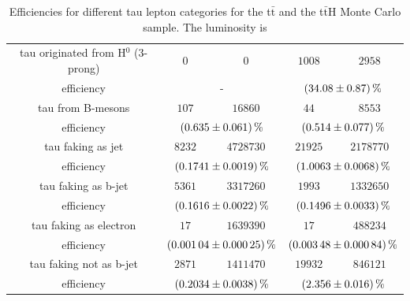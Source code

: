 \begin{table}
\begin{tabular*}{\linewidth}{@{\extracolsep{\fill}}ccccc}
		\\
		\hline
                tau originated from H$^0$ (3-prong)& $0$        & $0$         & $1008$          & $2958$
		\\
		efficiency                  & \multicolumn{2}{c}{-}   & \multicolumn{2}{c}{$\SI{34.08\pm 0.87}{\percent}$}
		\\
		\hline
		tau from B-mesons           & $107$            & $16860$      & $44$            & $8553$ 
		\\
		efficiency                  & \multicolumn{2}{c}{$\SI{0.635\pm 0.061}{\percent}$}   & \multicolumn{2}{c}{$\SI{0.514\pm 0.077}{\percent}$}
		\\
		\hline
		tau faking as jet            & $8232$         & $4728730$      & $21925$         & $2178770$ 
		\\
		efficiency                  & \multicolumn{2}{c}{$\SI{0.1741\pm 0.0019}{\percent}$}   & \multicolumn{2}{c}{$\SI{1.0063\pm 0.0068}{\percent}$}
		\\
		\hline
		tau faking as b-jet          & $5361$        & $3317260$      & $1993$         & $1332650$ 
		\\
		efficiency                  & \multicolumn{2}{c}{$\SI{0.1616\pm 0.0022}{\percent}$}   & \multicolumn{2}{c}{$\SI{0.1496\pm 0.0033}{\percent}$}
		\\
		\hline
                tau faking as electron          & $17$        & $1639390$      & $17$         & $488234$ 
		\\
		efficiency                  & \multicolumn{2}{c}{$\SI{0.00104\pm 0.00025}{\percent}$}   & \multicolumn{2}{c}{$\SI{0.00348\pm 0.00084}{\percent}$}
		\\
		\hline
                tau faking not as b-jet          & $2871$        & $1411470$      & $19932$         & $846121$ 
		\\
		efficiency                  & \multicolumn{2}{c}{$\SI{0.2034\pm 0.0038}{\percent}$}   & \multicolumn{2}{c}{$\SI{2.356\pm 0.016}{\percent}$}
		\\
		\hline
		\hline
		\end{tabular*}
		\caption[Efficiencies for the t$\bar{\text{t}}$ and the t$\bar{\text{t}}$H sample.]{Efficiencies for different tau lepton categories for the t$\bar{\text{t}}$ and the t$\bar{\text{t}}$H Monte Carlo sample. The luminosity is}
		\label{ttbarttHEffTable}
                \renewcommand{\arraystretch}{1}
                \end{table}
%
